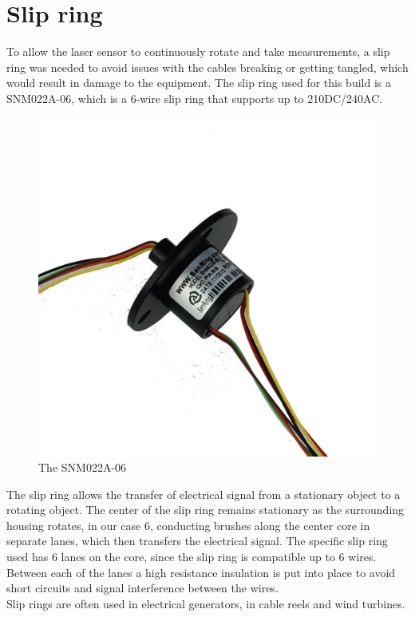 \clearpage
\section{Slip ring}

To allow the laser sensor to continuously rotate and take measurements, a slip ring was needed to avoid issues with the cables breaking or getting tangled, which would result in damage to the equipment. 
The slip ring used for this build is a SNM022A-06\cite{slipring}, which is a 6-wire slip ring that supports up to 210DC/240AC. 

\begin{figure}[H]
	\centering
	\includegraphics[width=.5\linewidth]{images/slipring-pic.jpg}
	\caption{The SNM022A-06}
	\label{slipringpic}	
\end{figure}

The slip ring allows the transfer of electrical signal from a stationary object to a rotating object. The center of the slip ring remains stationary as the surrounding housing rotates, in our case 6, conducting brushes along the center core in separate lanes, which then transfers the electrical signal.
The specific slip ring used has 6 lanes on the core, since the slip ring is compatible up to 6 wires. Between each of the lanes a high resistance insulation is put into place to avoid short circuits and signal interference between the wires\cite{slipringhow}.\\
Slip rings are often used in electrical generators, in cable reels and wind turbines.


